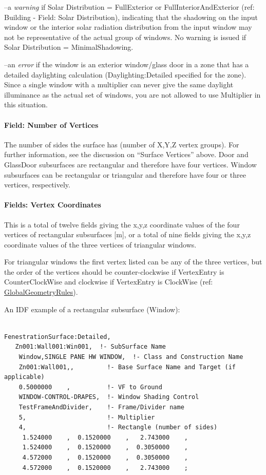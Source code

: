 --a \emph{warning} if Solar Distribution = FullExterior or FullInteriorAndExterior (ref: Building - Field: Solar Distribution), indicating that the shadowing on the input window or the interior solar radiation distribution from the input window may not be representative of the actual group of windows. No warning is issued if Solar Distribution = MinimalShadowing.

--an \emph{error} if the window is an exterior window/glass door in a zone that has a detailed daylighting calculation (Daylighting:Detailed specified for the zone). Since a single window with a multiplier can never give the same daylight illuminance as the actual set of windows, you are not allowed to use Multiplier in this situation.

\paragraph{Field: Number of Vertices}\label{field-number-of-vertices-4}

The number of sides the surface has (number of X,Y,Z vertex groups). For further information, see the discussion on ``Surface Vertices'' above. Door and GlassDoor subsurfaces are rectangular and therefore have four vertices. Window subsurfaces can be rectangular or triangular and therefore have four or three vertices, respectively.

\paragraph{Fields: Vertex Coordinates}\label{fields-vertex-coordinates}

This is a total of twelve fields giving the x,y,z coordinate values of the four vertices of rectangular subsurfaces {[}m{]}, or a total of nine fields giving the x,y,z coordinate values of the three vertices of triangular windows.

For triangular windows the first vertex listed can be any of the three vertices, but the order of the vertices should be counter-clockwise if VertexEntry is CounterClockWise and clockwise if VertexEntry is ClockWise (ref: \hyperref[globalgeometryrules]{GlobalGeometryRules}).

An IDF example of a rectangular subsurface (Window):

\begin{lstlisting}

FenestrationSurface:Detailed,
   Zn001:Wall001:Win001,  !- SubSurface Name
    Window,SINGLE PANE HW WINDOW,  !- Class and Construction Name
    Zn001:Wall001,,         !- Base Surface Name and Target (if applicable)
    0.5000000    ,          !- VF to Ground
    WINDOW-CONTROL-DRAPES,  !- Window Shading Control
    TestFrameAndDivider,    !- Frame/Divider name
    5,                      !- Multiplier
    4,                      !- Rectangle (number of sides)
     1.524000    ,  0.1520000    ,   2.743000    ,
     1.524000    ,  0.1520000    ,  0.3050000    ,
     4.572000    ,  0.1520000    ,  0.3050000    ,
     4.572000    ,  0.1520000    ,   2.743000    ;
\end{lstlisting}

